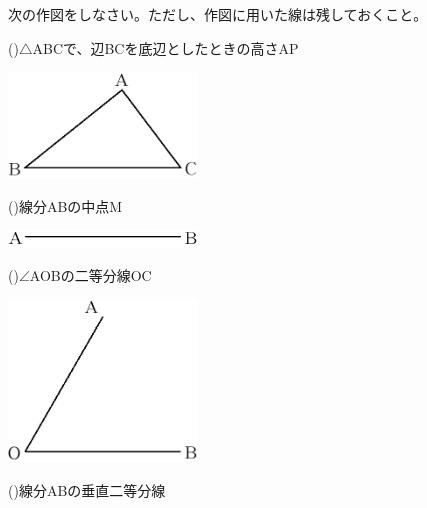 \documentclass[
  12pt,a4paper,lualatex,ja=standard]{bxjsarticle}
\begin{document}
\begin{flushleft}
\setcounter{skaunta}{0}

\noindent{} \hspace{1pt}次の作図をしなさい。ただし、作図に用いた線は残しておくこと。

()\hspace{2.5pt}$\triangle$ABCで、辺BCを底辺としたときの高さAP

\begin{center}
\def\@captype{figure}
\includegraphics[width=50mm]{media/image10.png}

\end{center}

()\hspace{2.5pt}線分ABの中点M

\vspace{30mm}

\begin{center}
\def\@captype{figure}
\includegraphics[width=50mm]{media/image11.png}

\end{center}

()\hspace{2.5pt}$\angle$AOBの二等分線OC

\begin{center}
\def\@captype{figure}
\includegraphics[width=50mm]{media/image8.png}

\end{center}

()\hspace{2.5pt}線分ABの垂直二等分線


\end{flushleft}
\end{document}
